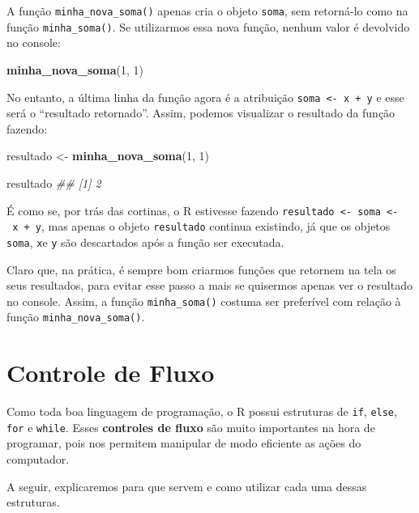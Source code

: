 \documentclass[]{book}
\newenvironment{Shaded}{\begin{snugshade}}{\end{snugshade}}
\newcommand{\CommentTok}[1]{\textcolor[rgb]{0.56,0.35,0.01}{\textit{#1}}}
\newcommand{\DecValTok}[1]{\textcolor[rgb]{0.00,0.00,0.81}{#1}}
\newcommand{\KeywordTok}[1]{\textcolor[rgb]{0.13,0.29,0.53}{\textbf{#1}}}
\newcommand{\NormalTok}[1]{#1}
\newcommand{\StringTok}[1]{\textcolor[rgb]{0.31,0.60,0.02}{#1}}
\begin{document}
A função \texttt{minha\_nova\_soma()} apenas cria o objeto \texttt{soma}, sem retorná-lo como na função \texttt{minha\_soma()}. Se utilizarmos essa nova função, nenhum valor é devolvido no console:

\begin{Shaded}
\begin{Highlighting}[]
\KeywordTok{minha_nova_soma}\NormalTok{(}\DecValTok{1}\NormalTok{, }\DecValTok{1}\NormalTok{)}
\end{Highlighting}
\end{Shaded}

No entanto, a última linha da função agora é a atribuição \texttt{soma\ \textless{}-\ x\ +\ y} e esse será o ``resultado retornado''. Assim, podemos visualizar o resultado da função fazendo:

\begin{Shaded}
\begin{Highlighting}[]
\NormalTok{resultado <-}\StringTok{ }\KeywordTok{minha_nova_soma}\NormalTok{(}\DecValTok{1}\NormalTok{, }\DecValTok{1}\NormalTok{)}

\NormalTok{resultado}
\CommentTok{## [1] 2}
\end{Highlighting}
\end{Shaded}

É como se, por trás das cortinas, o R estivesse fazendo \texttt{resultado\ \textless{}-\ soma\ \textless{}-\ x\ +\ y}, mas apenas o objeto \texttt{resultado} continua existindo, já que os objetos \texttt{soma}, \texttt{x}e \texttt{y} são descartados após a função ser executada.

Claro que, na prática, é sempre bom criarmos funções que retornem na tela os seus resultados, para evitar esse passo a mais se quisermos apenas ver o resultado no console. Assim, a função \texttt{minha\_soma()} costuma ser preferível com relação à função \texttt{minha\_nova\_soma()}.

\hypertarget{controle-de-fluxo}{%
\section{Controle de Fluxo}\label{controle-de-fluxo}}

Como toda boa linguagem de programação, o R possui estruturas de \texttt{if}, \texttt{else}, \texttt{for} e \texttt{while}. Esses \textbf{controles de fluxo} são muito importantes na hora de programar, pois nos permitem manipular de modo eficiente as ações do computador.

A seguir, explicaremos para que servem e como utilizar cada uma dessas estruturas.
\end{document}
